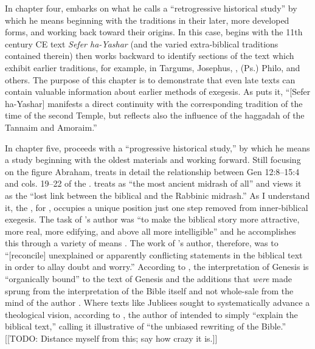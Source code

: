 In chapter four, \vermes embarks on what he calls a ``retrogressive historical study'' by which he means beginning with the traditions in their later, more developed forms, and working back toward their origins. In this case, \vermes begins with the 11th century CE text \emph{Sefer ha-Yashar} (and the varied extra-biblical traditions contained therein) then works backward to identify sections of the text which exhibit earlier traditions, for example, in Targums, Josephus, \jub, (Ps.) Philo, and others. The purpose of this chapter is to demonstrate that even late texts can contain valuable information about earlier methods of exegesis. As \vermes puts it, ``{[}Sefer ha-Yashar{]} manifests a direct continuity with the corresponding tradition of the time of the second Temple, but reflects also the influence of the haggadah of the Tannaim and Amoraim.''\autocite[95]{vermes1961} 

In chapter five, \vermes proceeds with a ``progressive historical study,'' by which he means a study beginning with the oldest materials and working forward. Still focusing on the figure Abraham, \vermes treats in detail the relationship between Gen 12:8--15:4 and cols. 19--22 of the \ga. \vermes treats \ga as ``the most ancient midrash of all''\autocite[124]{vermes1961} and views it as the ``lost link between the biblical and the Rabbinic midrash.'' \autocite[124]{vermes1961} As I understand it, the \ga, for \vermes, occupies a unique position just one step removed from inner-biblical exegesis. The task of \ga's author was ``to make the biblical story more attractive, more real, more edifying, and above all more intelligible'' and he accomplishes this through a variety of means \autocite[125]{vermes1961}. The work of \ga's author, therefore, was to ``{[}reconcile{]} unexplained or apparently conflicting statements in the biblical text in order to allay doubt and worry.''\autocite[125]{vermes1961} According to \vermes, the interpretation of Genesis is ``organically bound'' to the text of Genesis and the additions that \emph{were} made sprung from the interpretation of the Bible itself and not whole-sale from the mind of the author \autocite[126]{vermes1961}. Where texts like Jubliees sought to systematically advance a theological vision, according to \vermes, the author of \ga intended to simply ``explain the biblical text,'' calling it illustrative of ``the unbiased rewriting of the Bible.''\autocite[126]{vermes1961} [[TODO: Distance myself from this; say how crazy it is.]]

